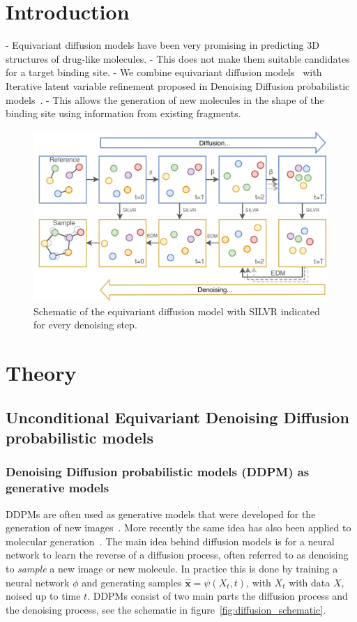 \documentclass[journal=jacsat,manuscript=article]{achemso}
\begin{document}
\section{Introduction}
- Equivariant diffusion models have been very promising in predicting 3D structures of drug-like molecules. 
- This does not make them suitable candidates for a target binding site. 
- We combine equivariant diffusion models~\cite{huang2022mdm} with Iterative latent variable refinement proposed in Denoising Diffusion probabilistic models~\cite{choi2021ilvr}.
- This allows the generation of new molecules in the shape of the binding site using information from existing fragments.
\begin{figure}
    \centering
    \includegraphics[width=\textwidth]{paper/Figures/Fig1/Schematic.png}
    \caption{Schematic of the equivariant diffusion model with  SILVR indicated for every denoising step.}
    \label{fig:schematic}
\end{figure}
\section{Theory}
\subsection{Unconditional Equivariant Denoising Diffusion probabilistic models}
\subsubsection*{Denoising Diffusion probabilistic models (DDPM) as generative models}
DDPMs are often used as generative models that were developed for the generation of new images~\cite{}. More recently the same idea has also been applied to molecular generation~\cite{}. The main idea behind diffusion models is for a neural network to learn the reverse of a diffusion process, often referred to as denoising to \textit{sample} a new image or new molecule. In practice this is done by training a neural network $\phi$ and generating samples $\hat{\mathbf{x}}=\psi(X_t,t)$, with $X_t$ with data $X$, noised up to time $t$.  DDPMs consist of two main parts the diffusion process and the denoising process, see the schematic in figure~\ref{fig:diffusion_schematic}.
\end{document}
